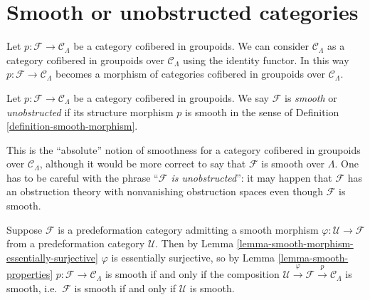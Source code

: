 \section{Smooth or unobstructed categories}
\label{section-smooth}

\noindent
Let $p : \mathcal{F} \to \mathcal{C}_\Lambda$ be a category cofibered in
groupoids. We can consider $\mathcal{C}_\Lambda$ as a category
cofibered in groupoids over $\mathcal{C}_\Lambda$ using the identity
functor. In this way
$p : \mathcal{F} \longrightarrow \mathcal{C}_\Lambda$
becomes
a morphism of categories cofibered in groupoids over $\mathcal{C}_\Lambda$.

\begin{definition}
\label{definition-cofibered-groupoid-projection-smooth}
Let $p : \mathcal{F} \to \mathcal{C}_\Lambda$ be a category cofibered in
groupoids. We say $\mathcal{F}$ is {\it smooth} or {\it unobstructed}
if its structure morphism $p$ is smooth
in the sense of Definition \ref{definition-smooth-morphism}.
\end{definition}

\noindent
This is the ``absolute'' notion of smoothness for a
category cofibered in groupoids over $\mathcal{C}_\Lambda$, although
it would be more correct to say that $\mathcal{F}$ is smooth over $\Lambda$.
One has to be careful with the phrase ``{\it $\mathcal{F}$ is unobstructed}'':
it may happen that
$\mathcal{F}$ has an obstruction theory with nonvanishing obstruction spaces
even though $\mathcal{F}$ is smooth.

\begin{remark}
\label{remark-smooth-on-top}
Suppose $\mathcal{F}$ is a predeformation category admitting a smooth morphism
$\varphi : \mathcal U \to \mathcal{F}$ from a predeformation category
$\mathcal{U}$.  Then by
Lemma \ref{lemma-smooth-morphism-essentially-surjective}
$\varphi$ is essentially surjective, so by
Lemma \ref{lemma-smooth-properties}
$p: \mathcal{F} \to \mathcal{C}_\Lambda$ is smooth if and only if the
composition $\mathcal U \xrightarrow{\varphi} \mathcal{F} \xrightarrow{p}
\mathcal{C}_\Lambda$ is smooth, i.e.\ $\mathcal{F}$ is smooth if and only if
$\mathcal{U}$ is smooth.
\end{remark}

